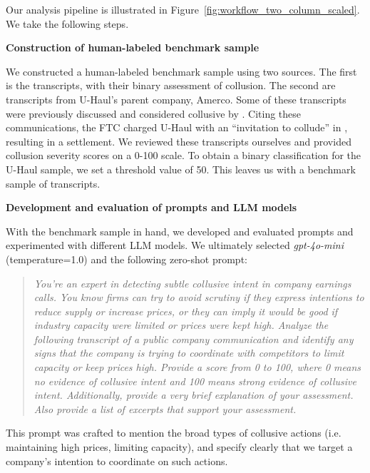 Our analysis pipeline is illustrated in Figure~\ref{fig:workflow_two_column_scaled}. We take the following steps.



\textbf{Construction of human-labeled benchmark sample}

We constructed a human-labeled benchmark sample using two sources. 
The first is the \textcite{aryal2022coordinated} transcripts, with 
their binary assessment of collusion. The second are transcripts 
from U-Haul's parent company, Amerco. Some of these transcripts 
were previously discussed and considered collusive by \textcite{harrington2022collusion}. 
Citing these communications, the FTC charged U-Haul with an ``invitation to collude'' 
in \textcite{uhaul2010ftc}, resulting in a settlement. We reviewed 
these transcripts ourselves and provided collusion severity scores 
on a 0-100 scale. To obtain a binary classification for the U-Haul 
sample, we set a threshold value of 50. This leaves us with a 
benchmark sample of  transcripts.

\textbf{Development and evaluation of prompts and LLM models}


With the benchmark sample in hand, we developed and evaluated 
prompts and experimented with different LLM models. We ultimately selected \textit{gpt-4o-mini} (temperature=1.0) and the following zero-shot prompt:
\begin{quote}
    \begin{minipage}{\linewidth}
    \textit{You’re an expert in detecting subtle collusive intent in company earnings calls. You know firms can try to avoid scrutiny if they express intentions to reduce supply or increase prices, or they can imply it would be good if industry capacity were limited or prices were kept high. Analyze the following transcript of a public company communication and identify any signs that the company is trying to coordinate with competitors to limit capacity or keep prices high. Provide a score from 0 to 100, where 0 means no evidence of collusive intent and 100 means strong evidence of collusive intent. Additionally, provide a very brief explanation of your assessment. Also provide a list of excerpts that support your assessment.}
    \end{minipage}
\end{quote}

This prompt was crafted to mention the broad types of collusive actions 
(i.e. maintaining high prices, limiting capacity), and specify 
clearly that we target a company's intention to coordinate on such actions.

